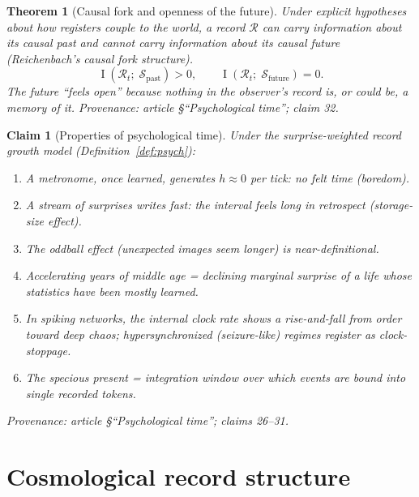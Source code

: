 \documentclass[11pt]{article}
\newtheorem{claim}{Claim}
\newtheorem{theorem}{Theorem}
\DeclareMathOperator{\MI}{I}
\newcommand{\cR}{\mathcal{R}}
\newcommand{\cS}{\mathcal{S}}
\begin{document}
\begin{theorem}[Causal fork and openness of the future]\label{thm:fork}
Under explicit hypotheses about how registers couple to the world, a record
$\cR$ can carry information about its causal past and cannot carry
information about its causal future (Reichenbach's causal fork structure).
\[
  \MI(\cR_t;\; \cS_{\mathrm{past}}) > 0, \qquad
  \MI(\cR_t;\; \cS_{\mathrm{future}}) = 0.
\]
The future ``feels open'' because nothing in the observer's record is, or
could be, a memory of it.
\emph{Provenance: article \S``Psychological time''; claim 32.}
\end{theorem}

\begin{claim}[Properties of psychological time]\label{cl:psychprops}
Under the surprise-weighted record growth model
(Definition~\ref{def:psych}):
\begin{enumerate}
  \item A metronome, once learned, generates $h \approx 0$ per tick:
    no felt time (boredom).
  \item A stream of surprises writes fast: the interval feels long in
    retrospect (storage-size effect).
  \item The oddball effect (unexpected images seem longer) is near-definitional.
  \item Accelerating years of middle age = declining marginal surprise of a
    life whose statistics have been mostly learned.
  \item In spiking networks, the internal clock rate shows a rise-and-fall
    from order toward deep chaos; hypersynchronized (seizure-like) regimes
    register as clock-stoppage.
  \item The specious present = integration window over which events are bound
    into single recorded tokens.
\end{enumerate}
\emph{Provenance: article \S``Psychological time''; claims 26--31.}
\end{claim}


\section{Cosmological record structure}
\end{document}
